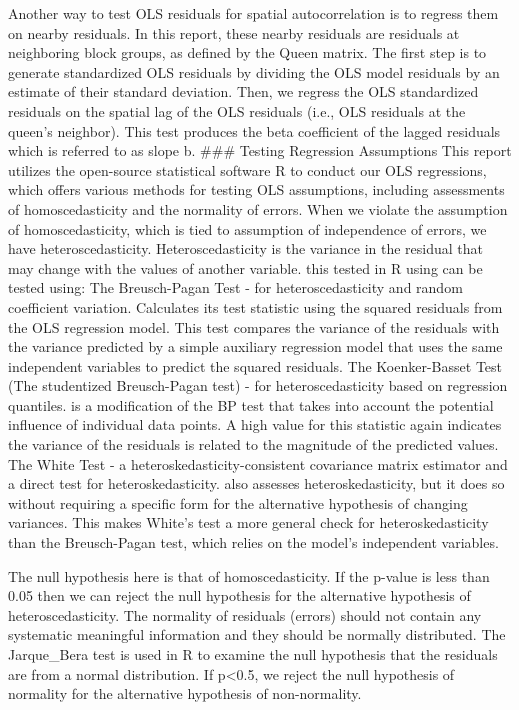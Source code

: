 \documentclass[
]{article}
\begin{document}
Another way to test OLS residuals for spatial autocorrelation is to
regress them on nearby residuals. In this report, these nearby residuals
are residuals at neighboring block groups, as defined by the Queen
matrix. The first step is to generate standardized OLS residuals by
dividing the OLS model residuals by an estimate of their standard
deviation. Then, we regress the OLS standardized residuals on the
spatial lag of the OLS residuals (i.e., OLS residuals at the queen's
neighbor). This test produces the beta coefficient of the lagged
residuals which is referred to as slope b. \#\#\# Testing Regression
Assumptions This report utilizes the open-source statistical software R
to conduct our OLS regressions, which offers various methods for testing
OLS assumptions, including assessments of homoscedasticity and the
normality of errors. When we violate the assumption of homoscedasticity,
which is tied to assumption of independence of errors, we have
heteroscedasticity. Heteroscedasticity is the variance in the residual
that may change with the values of another variable. this tested in R
using can be tested using: The Breusch-Pagan Test - for
heteroscedasticity and random coefficient variation. Calculates its test
statistic using the squared residuals from the OLS regression model.
This test compares the variance of the residuals with the variance
predicted by a simple auxiliary regression model that uses the same
independent variables to predict the squared residuals. The
Koenker-Basset Test (The studentized Breusch-Pagan test) - for
heteroscedasticity based on regression quantiles. is a modification of
the BP test that takes into account the potential influence of
individual data points. A high value for this statistic again indicates
the variance of the residuals is related to the magnitude of the
predicted values. The White Test - a heteroskedasticity-consistent
covariance matrix estimator and a direct test for heteroskedasticity.
also assesses heteroskedasticity, but it does so without requiring a
specific form for the alternative hypothesis of changing variances. This
makes White's test a more general check for heteroskedasticity than the
Breusch-Pagan test, which relies on the model's independent variables.

The null hypothesis here is that of homoscedasticity. If the p-value is
less than 0.05 then we can reject the null hypothesis for the
alternative hypothesis of heteroscedasticity. The normality of residuals
(errors) should not contain any systematic meaningful information and
they should be normally distributed. The Jarque\_Bera test is used in R
to examine the null hypothesis that the residuals are from a normal
distribution. If p\textless0.5, we reject the null hypothesis of
normality for the alternative hypothesis of non-normality.
\end{document}
